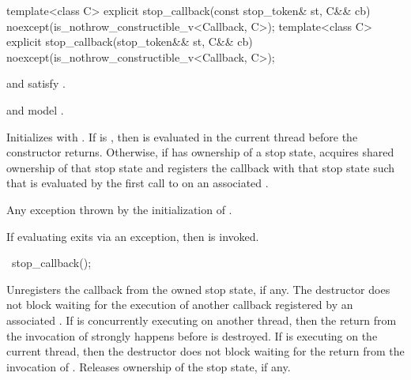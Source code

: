 %
\begin{itemdecl}
template<class C>
explicit stop_callback(const stop_token& st, C&& cb)
  noexcept(is_nothrow_constructible_v<Callback, C>);
template<class C>
explicit stop_callback(stop_token&& st, C&& cb)
  noexcept(is_nothrow_constructible_v<Callback, C>);
\end{itemdecl}
\begin{itemdescr}
\pnum
\constraints
{} and  satisfy .

\pnum
\expects
{} and  model .

\pnum
\effects
Initializes  with .
If  is , then
is evaluated in the current thread before the constructor returns.
Otherwise, if  has ownership of a stop state,
acquires shared ownership of that stop state and registers
the callback with that stop state
such that 
is evaluated by the first call to 
on an associated .

\pnum
\throws
Any exception thrown by the initialization of .

\pnum
\remarks
If evaluating
exits via an exception,
then  is invoked.
\end{itemdescr}

%
\begin{itemdecl}
~stop_callback();
\end{itemdecl}

\begin{itemdescr}
\pnum
\effects
Unregisters the callback from the owned stop state, if any.
The destructor does not block waiting for the execution of another callback
registered by an associated .
If  is concurrently executing on another thread,
then the return from the invocation of 
strongly happens before
 is destroyed.
If  is executing on the current thread,
then the destructor does not block waiting for
the return from the invocation of .
Releases ownership of the stop state, if any.
\end{itemdescr}


